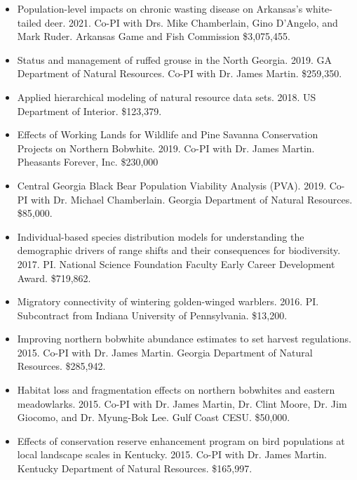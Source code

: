 \begin{itemize}

\item Population-level impacts on chronic wasting disease on
  Arkansas's white-tailed deer. 2021. Co-PI with Drs. Mike Chamberlain,
  Gino D'Angelo, and Mark Ruder. Arkansas Game and Fish Commission
  \$3,075,455. 

\item Status and management of ruffed grouse in the North
  Georgia. 2019. GA Department of Natural Resources. Co-PI with
  Dr. James Martin. \$259,350.

\item Applied hierarchical modeling of natural resource data
  sets. 2018. US Department of Interior. \$123,379.

\item Effects of Working Lands for Wildlife and Pine Savanna
  Conservation Projects on Northern Bobwhite. 2019. Co-PI with
  Dr. James Martin. Pheasants Forever, Inc. \$230,000

\item Central Georgia Black Bear Population Viability Analysis
  (PVA). 2019. Co-PI with Dr. Michael Chamberlain. Georgia Department
  of Natural Resources. \$85,000. 
  
\item Individual-based species distribution models for
  understanding the demographic drivers of range shifts and their
  consequences for biodiversity. 2017. PI. National Science
  Foundation Faculty Early Career Development Award. \$719,862. 

\item Migratory connectivity of wintering golden-winged
  warblers. 2016. PI. Subcontract from Indiana University of
  Pennsylvania. \$13,200. 

\item Improving northern bobwhite abundance estimates to set harvest
  regulations. 2015. Co-PI with Dr. James Martin. Georgia Department of
  Natural Resources. \$285,942.


\item Habitat loss and fragmentation effects on northern bobwhites and
  eastern meadowlarks. 2015. Co-PI with Dr. James Martin, Dr. Clint Moore,
  Dr. Jim Giocomo, and Dr. Myung-Bok Lee. Gulf Coast CESU. \$50,000. 

\item Effects of conservation reserve enhancement program on bird
  populations at local landscape scales in Kentucky. 2015. Co-PI with
  Dr. James Martin. Kentucky Department of Natural Resources. \$165,997.


\end{itemize}
